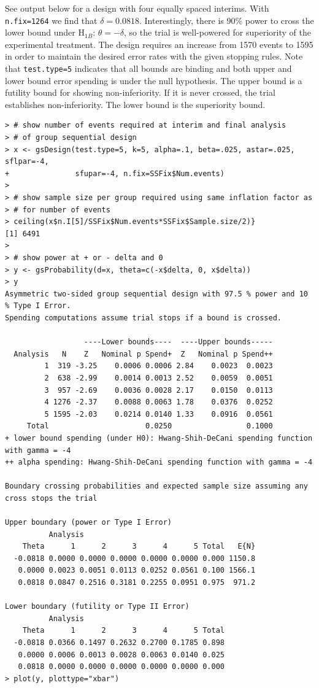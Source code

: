 See output below for a design with four equally spaced interims. With
\texttt{n.fix=1264} we find that $\delta=0.0818$. Interestingly, there is
90\% power to cross the lower bound under H$_{1B}$: $\theta = -\delta$, so the
trial is well-powered for superiority of the experimental treatment. The
design requires an increase from 1570 events to 1595 in order to maintain the
desired error rates with the given stopping rules. Note that
\texttt{test.type=5} indicates that all bounds are binding and both upper and
lower bound error spending is under the null hypothesis. The upper bound is a
futility bound for showing non-inferiority. If it is never crossed, the trial
establishes non-inferiority. The lower bound is the superiority bound.

\bigskip
\begin{verbatim}
> # show number of events required at interim and final analysis
> # of group sequential design
> x <- gsDesign(test.type=5, k=5, alpha=.1, beta=.025, astar=.025, sflpar=-4,
+               sfupar=-4, n.fix=SSFix$Num.events)
>
> # show sample size per group required using same inflation factor as
> # for number of events
> ceiling(x$n.I[5]/SSFix$Num.events*SSFix$Sample.size/2)}
[1] 6491
>
> # show power at + or - delta and 0
> y <- gsProbability(d=x, theta=c(-x$delta, 0, x$delta))
> y
Asymmetric two-sided group sequential design with 97.5 % power and 10 % Type I Error.
Spending computations assume trial stops if a bound is crossed.

                  ----Lower bounds----  ----Upper bounds-----
  Analysis   N    Z   Nominal p Spend+  Z   Nominal p Spend++
         1  319 -3.25    0.0006 0.0006 2.84    0.0023  0.0023
         2  638 -2.99    0.0014 0.0013 2.52    0.0059  0.0051
         3  957 -2.69    0.0036 0.0028 2.17    0.0150  0.0113
         4 1276 -2.37    0.0088 0.0063 1.78    0.0376  0.0252
         5 1595 -2.03    0.0214 0.0140 1.33    0.0916  0.0561
     Total                      0.0250                 0.1000 
+ lower bound spending (under H0): Hwang-Shih-DeCani spending function with gamma = -4
++ alpha spending: Hwang-Shih-DeCani spending function with gamma = -4

Boundary crossing probabilities and expected sample size assuming any cross stops the trial

Upper boundary (power or Type I Error)
          Analysis
    Theta      1      2      3      4      5 Total   E{N}
  -0.0818 0.0000 0.0000 0.0000 0.0000 0.0000 0.000 1150.8
   0.0000 0.0023 0.0051 0.0113 0.0252 0.0561 0.100 1566.1
   0.0818 0.0847 0.2516 0.3181 0.2255 0.0951 0.975  971.2

Lower boundary (futility or Type II Error)
          Analysis
    Theta      1      2      3      4      5 Total
  -0.0818 0.0366 0.1497 0.2632 0.2700 0.1785 0.898
   0.0000 0.0006 0.0013 0.0028 0.0063 0.0140 0.025
   0.0818 0.0000 0.0000 0.0000 0.0000 0.0000 0.000
> plot(y, plottype="xbar")
\end{verbatim}
\bigskip

